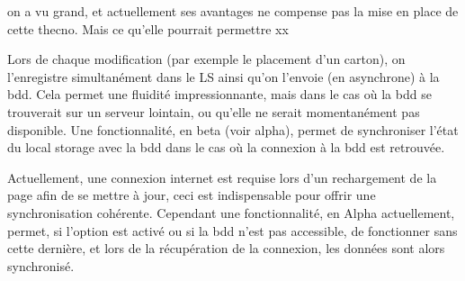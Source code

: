   on a vu grand, et actuellement ses avantages ne compense pas la mise en place de cette thecno.  Mais ce qu'elle pourrait permettre xx

  Lors de chaque modification (par exemple le placement d'un carton), on l'enregistre simultanément dans le LS ainsi qu'on l'envoie (en asynchrone) à la bdd.  Cela permet une fluidité impressionnante, mais dans le cas où la bdd se trouverait sur un serveur lointain, ou qu'elle ne serait momentanément pas disponible.  Une fonctionnalité, en beta (voir alpha), permet de synchroniser l'état du local storage avec la bdd dans le cas où la connexion à la bdd est retrouvée.
    
    Actuellement, une connexion internet est requise lors d'un rechargement de la page afin de se mettre à jour, ceci est indispensable pour offrir une synchronisation cohérente. Cependant une fonctionnalité, en Alpha actuellement, permet, si l'option est activé ou si la bdd n'est pas accessible, de fonctionner sans cette dernière, et lors de la récupération de la connexion, les données sont alors synchronisé.

